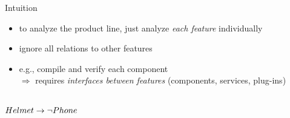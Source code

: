 \begin{frame}{\myframetitle}
	\begin{mycolumns}
		\begin{definition}{Intuition}
			\begin{itemize}
				\item to analyze the product line, just analyze \emph{each feature} individually
				\item ignore all relations to other features
				\item e.g., compile and verify each component\\
				$\Rightarrow$ requires \emph{interfaces between features} (components, services, plug-ins) %
			\end{itemize}
		\end{definition}
		\begin{exampletight}{}
			\centering\featureDiagramLego\\$Helmet \rightarrow \neg Phone$
		\end{exampletight}
	\mynextcolumn
	\end{mycolumns}
\end{frame}

